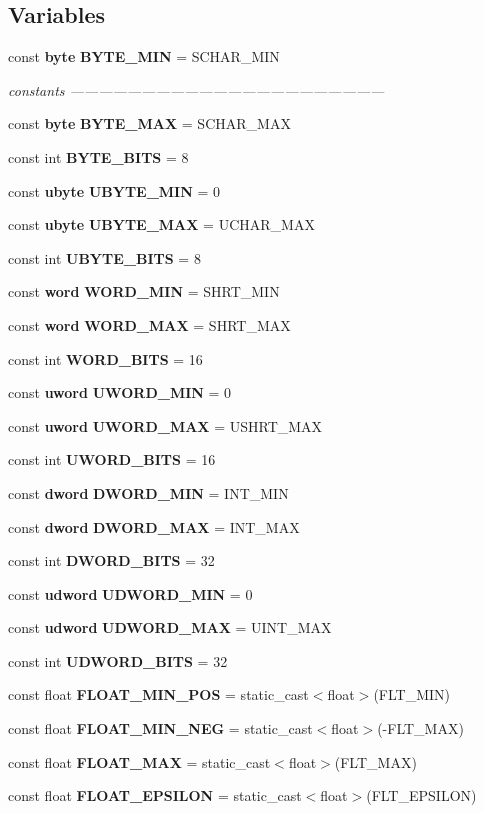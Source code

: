 \subsection*{Variables}
\begin{CompactItemize}
\item 
const {\bf byte} {\bf BYTE\_\-MIN} = SCHAR\_\-MIN
\begin{CompactList}\small\item\em constants ------------------------------------------------------------------ \item\end{CompactList}\item 
const {\bf byte} {\bf BYTE\_\-MAX} = SCHAR\_\-MAX
\item 
const int {\bf BYTE\_\-BITS} = 8
\item 
const {\bf ubyte} {\bf UBYTE\_\-MIN} = 0
\item 
const {\bf ubyte} {\bf UBYTE\_\-MAX} = UCHAR\_\-MAX
\item 
const int {\bf UBYTE\_\-BITS} = 8
\item 
const {\bf word} {\bf WORD\_\-MIN} = SHRT\_\-MIN
\item 
const {\bf word} {\bf WORD\_\-MAX} = SHRT\_\-MAX
\item 
const int {\bf WORD\_\-BITS} = 16
\item 
const {\bf uword} {\bf UWORD\_\-MIN} = 0
\item 
const {\bf uword} {\bf UWORD\_\-MAX} = USHRT\_\-MAX
\item 
const int {\bf UWORD\_\-BITS} = 16
\item 
const {\bf dword} {\bf DWORD\_\-MIN} = INT\_\-MIN
\item 
const {\bf dword} {\bf DWORD\_\-MAX} = INT\_\-MAX
\item 
const int {\bf DWORD\_\-BITS} = 32
\item 
const {\bf udword} {\bf UDWORD\_\-MIN} = 0
\item 
const {\bf udword} {\bf UDWORD\_\-MAX} = UINT\_\-MAX
\item 
const int {\bf UDWORD\_\-BITS} = 32
\item 
const float {\bf FLOAT\_\-MIN\_\-POS} = static\_\-cast$<$float$>$(FLT\_\-MIN)
\item 
const float {\bf FLOAT\_\-MIN\_\-NEG} = static\_\-cast$<$float$>$(-FLT\_\-MAX)
\item 
const float {\bf FLOAT\_\-MAX} = static\_\-cast$<$float$>$(FLT\_\-MAX)
\item 
const float {\bf FLOAT\_\-EPSILON} = static\_\-cast$<$float$>$(FLT\_\-EPSILON)

\end{CompactItemize}
